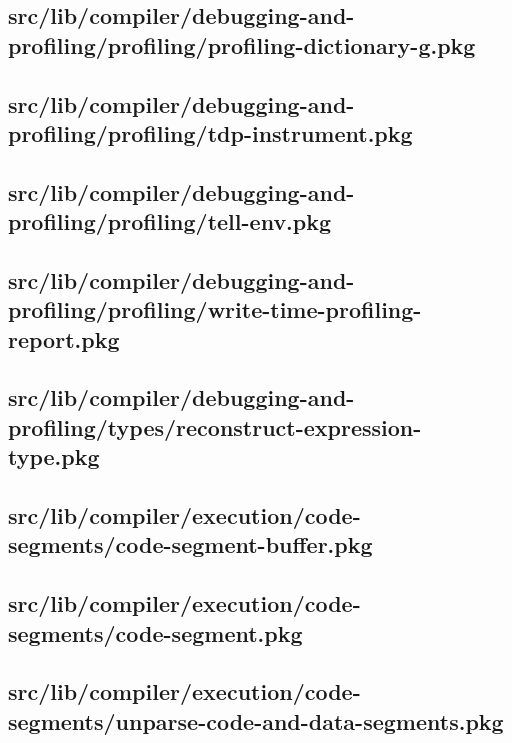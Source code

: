 \subsection{src/lib/compiler/debugging-and-profiling/profiling/profiling-dictionary-g.pkg}


\subsection{src/lib/compiler/debugging-and-profiling/profiling/tdp-instrument.pkg}


\subsection{src/lib/compiler/debugging-and-profiling/profiling/tell-env.pkg}


\subsection{src/lib/compiler/debugging-and-profiling/profiling/write-time-profiling-report.pkg}


\subsection{src/lib/compiler/debugging-and-profiling/types/reconstruct-expression-type.pkg}


\subsection{src/lib/compiler/execution/code-segments/code-segment-buffer.pkg}


\subsection{src/lib/compiler/execution/code-segments/code-segment.pkg}


\subsection{src/lib/compiler/execution/code-segments/unparse-code-and-data-segments.pkg}



